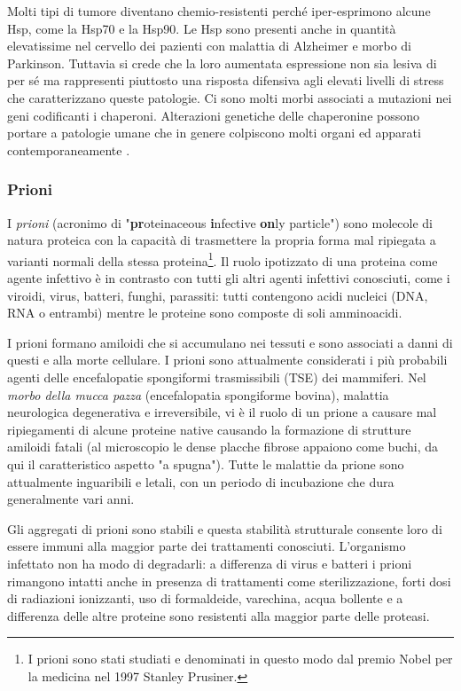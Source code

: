 {Molti tipi di tumore diventano chemio-resistenti perché iper-esprimono alcune Hsp, come la Hsp70 e la Hsp90. Le Hsp sono presenti anche in quantità elevatissime nel cervello dei pazienti con malattia di Alzheimer e morbo di Parkinson. Tuttavia si crede che la loro aumentata espressione non sia lesiva di per sé ma rappresenti piuttosto una risposta difensiva agli elevati livelli di stress che caratterizzano queste patologie. Ci sono molti morbi associati a mutazioni nei geni codificanti i chaperoni. Alterazioni genetiche delle chaperonine possono portare a patologie umane che in genere colpiscono molti organi ed apparati contemporaneamente \supercite{chaperoninaWiki}. \\


\subsubsection{Prioni}
\par I \textit{prioni} (acronimo di "\textbf{pr}oteinaceous \textbf{i}nfective \textbf{on}ly particle") sono molecole di natura proteica con la capacità di trasmettere la propria forma mal ripiegata a varianti normali della stessa proteina\footnote{I prioni sono stati studiati e denominati in questo modo dal premio Nobel per la medicina nel 1997 Stanley Prusiner\supercite{prusiner1998prion}.}. Il ruolo ipotizzato di una proteina come agente infettivo è in contrasto con tutti gli altri agenti infettivi conosciuti, come i viroidi, virus, batteri, funghi, parassiti: tutti contengono acidi nucleici (DNA, RNA o entrambi) mentre le proteine sono composte di soli amminoacidi.

\par I prioni formano amiloidi che si accumulano nei tessuti e sono associati a danni di questi e alla morte cellulare. I prioni sono attualmente considerati i più probabili agenti delle encefalopatie spongiformi trasmissibili (TSE) dei mammiferi. Nel \textit{morbo della mucca pazza} (encefalopatia spongiforme bovina), malattia neurologica degenerativa e irreversibile, vi è il ruolo di un prione a causare mal ripiegamenti di alcune proteine native causando la formazione di strutture amiloidi fatali (al microscopio le dense placche fibrose appaiono come buchi, da qui il caratteristico aspetto "a spugna"). Tutte le malattie da prione sono attualmente inguaribili e letali, con un periodo di incubazione che dura generalmente vari anni.

\par Gli aggregati di prioni sono stabili e questa stabilità strutturale consente loro di essere immuni alla maggior parte dei trattamenti conosciuti. L'organismo infettato non ha modo di degradarli: a differenza di virus e batteri i prioni rimangono intatti anche in presenza di trattamenti come sterilizzazione, forti dosi di radiazioni ionizzanti, uso di formaldeide, varechina, acqua bollente e a differenza delle altre proteine sono resistenti alla maggior parte delle proteasi.

}
